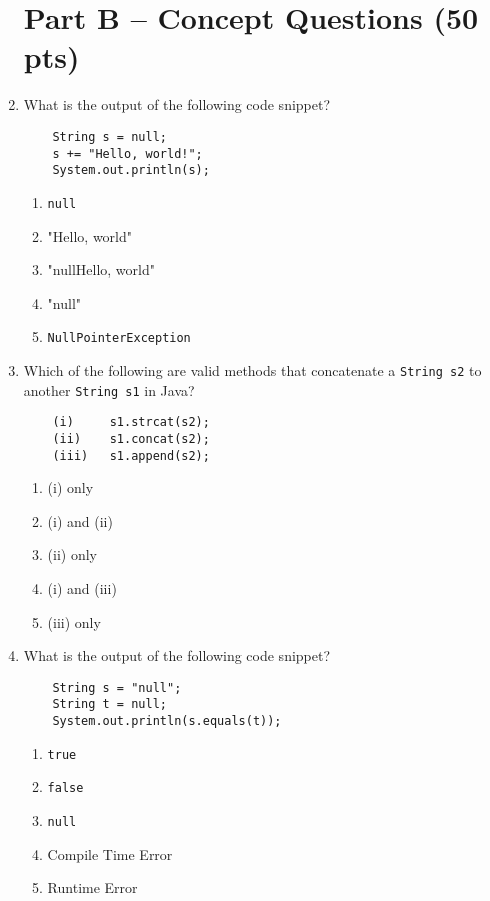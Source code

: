 \documentclass[S17-Final.tex]{subfiles}
\begin{document}
\begin{enumerate}
\clearpage
\section*{Part B -- Concept Questions (50 pts)}

\item What is the output of the following code snippet?
\begin{lstlisting}
    String s = null;
    s += "Hello, world!";
    System.out.println(s);  
\end{lstlisting}

\begin{enumerate}
\item  \texttt{null}
\item  "Hello, world"
\item "nullHello, world" \ifdraft \Ans \fi 
\item "null"
\item \texttt{NullPointerException}
\end{enumerate}

\item Which of the following are valid methods that concatenate a \texttt{String s2} to another \texttt{String  s1} in Java?
\begin{lstlisting}
    (i)     s1.strcat(s2);
    (ii)    s1.concat(s2);
    (iii)   s1.append(s2);
\end{lstlisting}

\begin{enumerate}
\item  (i) only
\item  (i) and (ii)
\item  (ii) only \ifdraft \Ans \fi 
\item  (i) and (iii)
\item  (iii) only
\end{enumerate}

\item What is the output of the following code snippet?
\begin{lstlisting}
    String s = "null";
    String t = null;
    System.out.println(s.equals(t));
\end{lstlisting}

\begin{enumerate}
\item \texttt{true}
\item \texttt{false} \ifdraft \Ans \fi 
\item \texttt{null}
\item Compile Time Error
\item Runtime Error
\end{enumerate}


\end{enumerate}
\end{document}
